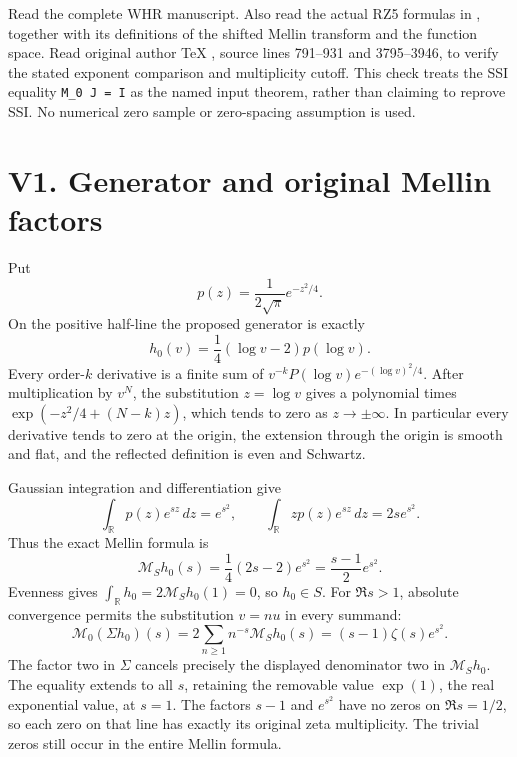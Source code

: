 Read the complete WHR manuscript. Also read the actual RZ5 formulas in
\href{https://github.com/KokunoYumeto/zeta-function-research-reader/blob/36a82ecca98addb8a98b48204e349737856c7223/workbenches/splitzero-tandem/continuations/20260924-cohomology-weight-and-character-lifts/gct-weight-control/proofs/ORIGINAL_ZETA_RESOLVENT_AND_PROJECTORS.md}{},
together with its definitions of the shifted Mellin transform and the
function space. Read original author TeX
\href{https://arxiv.org/abs/math/9811068v1}{},
source lines 791--931 and 3795--3946, to verify the stated exponent
comparison and multiplicity cutoff. This check treats the SSI equality
\texttt{M\_0\ J\ =\ I} as the named input theorem, rather than claiming
to reprove SSI. No numerical zero sample or zero-spacing assumption is
used.

\section{V1. Generator and original Mellin
factors}\label{v1.-generator-and-original-mellin-factors}

Put \[
p(z)=\frac1{2\sqrt\pi}e^{-z^2/4}.
\] On the positive half-line the proposed generator is exactly \[
h_0(v)=\frac14(\log v-2)p(\log v).
\] Every order-\(k\) derivative is a finite sum of
\(v^{-k}P(\log v)e^{-(\log v)^2/4}\). After multiplication by \(v^N\),
the substitution \(z=\log v\) gives a polynomial times
\(\exp(-z^2/4+(N-k)z)\), which tends to zero as \(z\to\pm\infty\). In
particular every derivative tends to zero at the origin, the extension
through the origin is smooth and flat, and the reflected definition is
even and Schwartz.

Gaussian integration and differentiation give \[
\int_{\mathbb R}p(z)e^{sz}\,dz=e^{s^2},\qquad
\int_{\mathbb R}zp(z)e^{sz}\,dz=2s e^{s^2}.
\] Thus the exact Mellin formula is \[
\mathcal M_S h_0(s)=\frac14(2s-2)e^{s^2}
=\frac{s-1}{2}e^{s^2}.
\] Evenness gives \(\int_{\mathbb R}h_0=2\mathcal M_Sh_0(1)=0\), so
\(h_0\in S\). For \(\Re s>1\), absolute convergence permits the
substitution \(v=nu\) in every summand: \[
\mathcal M_0(\Sigma h_0)(s)
=2\sum_{n\ge1}n^{-s}\mathcal M_Sh_0(s)
=(s-1)\zeta(s)e^{s^2}.
\] The factor two in \(\Sigma\) cancels precisely the displayed
denominator two in \(\mathcal M_Sh_0\). The equality extends to all
\(s\), retaining the removable value \(\exp(1)\), the real exponential
value, at \(s=1\). The factors \(s-1\) and \(e^{s^2}\) have no zeros on
\(\Re s=1/2\), so each zero on that line has exactly its original zeta
multiplicity. The trivial zeros still occur in the entire Mellin
formula.

